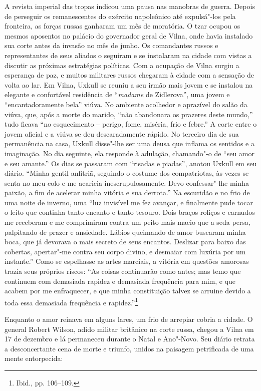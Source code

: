 A revista imperial das tropas indicou uma pausa nas manobras de guerra.
Depois de perseguir os remanescentes do exército napoleônico até
expulsá"-los pela fronteira, as forças russas ganharam um mês de
moratória. O tzar ocupou os mesmos aposentos no palácio do governador
geral de Vilna, onde havia instalado sua corte antes da invasão no mês
de junho. Os comandantes russos e representantes de seus aliados o
seguiram e se instalaram na cidade com vistas a discutir as próximas
estratégias políticas. Com a ocupação de Vilna surgiu a esperança de
paz, e muitos militares russos chegaram à cidade com a sensação de volta
ao lar. Em Vilna, Uxkull se reuniu a seu irmão mais jovem e se instalou
na elegante e confortável residência de ``\textit{madame} de Zidlerova'', uma
jovem e ``encantadoramente bela'' viúva. No ambiente acolhedor e
aprazível do salão da viúva, que, após a morte do marido, ``não
abandonara os prazeres deste mundo,'' tudo ficava ``no esquecimento --
perigo, fome, miséria, frio e febre.'' A corte entre o jovem oficial e a
viúva se deu descaradamente rápido. No terceiro dia de sua permanência
na casa, Uxkull disse"-lhe ser uma deusa que inflama os sentidos e a
imaginação. No dia seguinte, ela responde à adulação, chamando"-o de
``seu amor e seu amante.'' Os dias se passaram com ``risadas e piadas'',
anotou Uxkull em seu diário. ``Minha gentil anfitriã, seguindo o costume
dos compatriotas, às vezes se senta no meu colo e me acaricia
inescrupulosamente. Devo confessar"-lhe minha paixão, a fim de acelerar
minha vitória e sua derrota.'' Na escuridão e no frio de uma noite de
inverno, uma ``luz invisível me fez avançar, e finalmente pude tocar o
leito que continha tanto encanto e tanto tesouro. Dois braços roliços e
carnudos me receberam e me comprimiram contra um peito mais macio que a
seda persa, palpitando de prazer e ansiedade. Lábios queimando de amor
buscaram minha boca, que já devorava o mais secreto de seus encantos.
Deslizar para baixo das cobertas, apertar"-me contra seu corpo divino, e
desmaiar com luxúria por um instante.'' Como se espelhasse as artes
marciais, a vitória em questões amorosas trazia seus próprios riscos:
``As coisas continuarão como antes; mas temo que continuem com demasiada
rapidez e demasiada frequência para mim, e que acabem por me
enfraquecer, e que minha constituição talvez se arruine devido a toda
essa demasiada frequência e rapidez.''\footnote{Ibid., pp. 106--109.}

Enquanto o amor reinava em alguns lares, um frio de arrepiar cobria a
cidade. O general Robert Wilson, adido militar britânico na corte russa,
chegou a Vilna em 17 de dezembro e lá permaneceu durante o Natal e
Ano"-Novo. Seu diário retrata a desconcertante cena de morte e triunfo,
unidos na paisagem petrificada de uma mente entorpecida:

